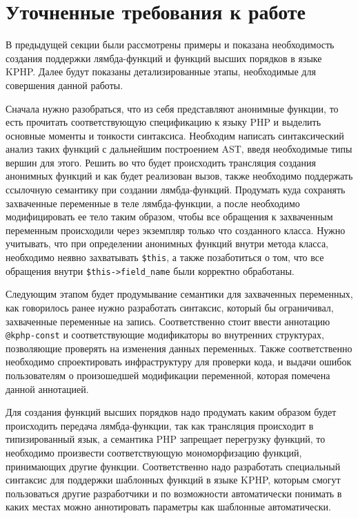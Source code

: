 \section{Уточненные требования к работе}
В предыдущей секции были рассмотрены примеры и показана необходимость создания поддержки лямбда-функций и функций высших порядков в языке KPHP. Далее будут показаны детализированные этапы, необходимые для совершения данной работы.

Сначала нужно разобраться, что из себя представляют анонимные функции, то есть прочитать соответствующую спецификацию к языку PHP и выделить основные моменты и тонкости синтаксиса.
Необходим написать синтаксический анализ таких функций с дальнейшим построением AST, введя необходимые типы вершин для этого.
Решить во что будет происходить трансляция создания анонимных функций и как будет реализован вызов, также необходимо поддержать ссылочную семантику при создании лямбда-функций.
Продумать куда сохранять захваченные переменные в теле лямбда-функции, а после необходимо модифицировать ее тело таким образом, чтобы все обращения к захваченным переменным происходили через экземпляр только что созданного класса.
Нужно учитывать, что при определении анонимных функций внутри метода класса, необходимо неявно захватывать \verb|$this|, а также позаботиться о том, что все обращения внутри \verb|$this->field_name| были корректно обработаны.

Следующим этапом будет продумывание семантики для захваченных переменных, как говорилось ранее нужно разработать синтаксис, который бы ограничивал, захваченные переменные на запись.
Соответственно стоит ввести аннотацию \verb|@kphp-const| и соответствующие модификаторы во внутренних структурах, позволяющие проверять на изменения данных переменных.
Также соответственно необходимо спроектировать инфраструктуру для проверки кода, и выдачи ошибок пользователям о произошедшей модификации переменной, которая помечена данной аннотацией.

Для создания функций высших порядков надо продумать каким образом будет происходить передача лямбда-функции, так как трансляция происходит в типизированный язык, а семантика PHP запрещает перегрузку функций, то необходимо произвести соответствующую мономорфизацию функций, принимающих другие функции.
Соответственно надо разработать специальный синтаксис для поддержки шаблонных функций в языке KPHP, которым смогут пользоваться другие разработчики и по возможности автоматически понимать в каких местах можно аннотировать параметры как шаблонные автоматически.

